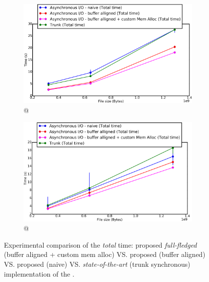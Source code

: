 			\begin{figure}[!h]
				\centering
				\begin{subfigure}[b]{0.475\textwidth}
					\centering
					\includegraphics[width=\textwidth]{charts/cubeRemapper_customMemAlloc_overall_time_workstation_8core.png}
					\caption[\targetPlatformLaptop \space @ \targetPlatformLaptopFrequency]%
					{{\small \targetPlatformLaptop \space @ \targetPlatformLaptopFrequency}}
					\label{fig:cubeRemapper_customMemAlloc_overall_time_workstation_8core}
				\end{subfigure}
				\hfill
				\begin{subfigure}[b]{0.475\textwidth}
					\centering
					\includegraphics[width=\textwidth]{charts/cubeRemapper_customMemAlloc_overall_time_hpc.png}
					\caption[]%
					{{\small \targetPlatformHpc \space @ \targetPlatformHpcFrequency}}
					\label{fig:cubeRemapper_customMemAlloc_overall_time_hpc}
				\end{subfigure}
				\caption{Experimental comparison of the \emph{total} time: proposed \emph{full-fledged} (buffer aligned + custom mem alloc) VS. proposed \emph{\notationaio}\space (buffer aligned) VS. proposed \emph{\notationaio}\space (naive) VS. \emph{state-of-the-art} (trunk synchronous) implementation of the \toolTargetSoftware.}
				\label{fig:cubeRemapper_customMemAlloc_overall_time}
			\end{figure}





